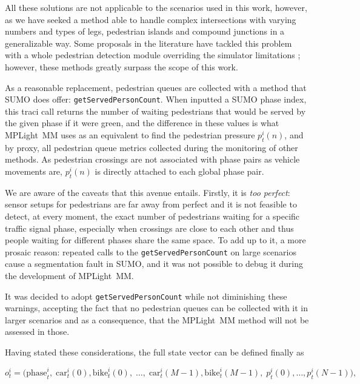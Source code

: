 All these solutions are not applicable to the scenarios used in this work, however, as we have seeked a method able to handle complex intersections with varying numbers and types of legs, pedestrian islands and compound junctions in a generalizable way. Some proposals in the literature have tackled this problem with a whole pedestrian detection module overriding the simulator limitations \cite{Zhang2025}; however, these methods greatly surpass the scope of this work.

As a reasonable replacement, pedestrian queues are collected with a method that SUMO does offer: \texttt{getServedPersonCount}. When inputted a SUMO phase index, this \gls{traci} call returns the number of waiting pedestrians that would be served by the given phase if it were green, and the difference in these values is what MPLight~MM uses as an equivalent to find the pedestrian pressure $p_t^i(n)$, and by proxy, all pedestrian queue metrics collected during the monitoring of other methods. As pedestrian crossings are not associated with phase pairs as vehicle movements are, $p_t^i(n)$ is directly attached to each global phase pair. \label{par:putosumo}

We are aware of the caveats that this avenue entails. Firstly, it is \textit{too perfect}: sensor setups for pedestrians are far away from perfect and it is not feasible to detect, at every moment, the exact number of pedestrians waiting for a specific traffic signal phase, especially when crossings are close to each other and thus people waiting for different phases share the same space. To add up to it, a more prosaic reason: repeated calls to the \texttt{getServedPersonCount} on large scenarios cause a segmentation fault in SUMO, and it was not possible to debug it during the development of MPLight~MM.

It was decided to adopt \texttt{getServedPersonCount} while not diminishing these warnings, accepting the fact that no pedestrian queues can be collected with it in larger scenarios and as a consequence, that the MPLight~MM method will not be assessed in those.

\medskip

\noindent Having stated these considerations, the full state vector can be defined finally as

\begin{equation}
o_t^i = \Big(\mathrm{phase}_t^i,\; \mathrm{car}_t^i(0), \mathrm{bike}_t^i(0),\; \dots,\; \mathrm{car}_t^i(M{-}1), \mathrm{bike}_t^i(M{-}1),\; p_t^i(0), \dots, p_t^i(N{-}1)\Big),
\end{equation}

